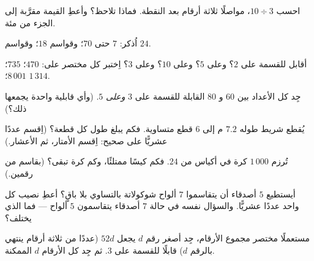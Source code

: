 \begin{exercise}[$\star$]\label{exo:g5:division:4}
احسب $10 \div 3$، مواصلًا ثلاثة أرقام بعد النقطة. فماذا
تلاحظ؟ وأعطِ القيمة مقرَّبة إلى الجزء من مئة.
\end{exercise}

\begin{exercise}[$\star$]\label{exo:g5:division:5}
اُذكر:  $7$ حتى $70$؛ وقواسم $18$؛
وقواسم $24$.
\end{exercise}

\begin{exercise}[$\star$]\label{exo:g5:division:6}
أقابل للقسمة على $2$؟ وعلى $5$؟ وعلى $10$؟ وعلى $3$؟ اِختبر كل مختصر على:
$470$؛ \quad $735$؛ \quad $8\,001$؛ \quad $1\,314$.
\end{exercise}

\begin{exercise}[$\star$]\label{exo:g5:division:7}
جِد كل الأعداد بين $60$ و $80$ القابلة للقسمة على
$3$ \emph{وعلى} $5$. (وأي قابلية واحدة يجمعها
ذلك؟)
\end{exercise}

\begin{exercise}[$\star$]\label{exo:g5:division:8}
يُقطع شريط طوله $7.2$ م إلى $6$ قطع متساوية. فكم يبلغ طول كل
قطعة؟ (اِقسم عددًا عشريًّا على صحيح: اِقسم الأمتار، ثم
الأعشار.)
\end{exercise}

\begin{exercise}[$\star$]\label{exo:g5:division:9}
تُرزم $1\,000$ كرة في أكياس من $24$. فكم كيسًا ممتلئًا،
وكم كرة تبقى؟ (بقاسم من رقمين.)
\end{exercise}

\begin{exercise}[$\star\star$]\label{exo:g5:division:10}
أيستطيع $5$ أصدقاء أن يتقاسموا $7$ ألواح شوكولاتة بالتساوي بلا باقٍ؟
أعطِ نصيب كل واحد عددًا عشريًّا. والسؤال نفسه في حالة $7$ أصدقاء
يتقاسمون $5$ ألواح --- فما الذي يختلف؟
\end{exercise}

\begin{exercise}[$\star\star$]\label{exo:g5:division:11}
مستعملًا مختصر مجموع الأرقام، جِد أصغر رقم $d$ يجعل
$52d$ (عددًا من ثلاثة أرقام ينتهي بالرقم $d$) قابلًا للقسمة على $3$. ثم
جِد كل الأرقام $d$ الممكنة.
\end{exercise}
